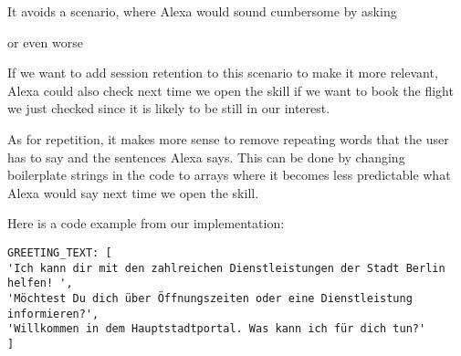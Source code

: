 

\noindent It avoids a scenario, where Alexa would sound cumbersome by asking

\begin{flushright}
\end{flushright}

\noindent or even worse
\begin{flushright}
\end{flushright}

\noindent If we want to add session retention to this scenario to make it more relevant, Alexa could also check next time we open the skill if we want to book the flight we just checked since it is likely to be still in our interest.

As for repetition, it makes more sense to remove repeating words that the user has to say and the sentences Alexa says. This can be done by changing boilerplate strings in the code to arrays where it becomes less predictable what Alexa would say next time we open the skill.

\noindent  Here is a code example from our implementation:

\begin{verbatim}
GREETING_TEXT: [
'Ich kann dir mit den zahlreichen Dienstleistungen der Stadt Berlin helfen! ',
'Möchtest Du dich über Öffnungszeiten oder eine Dienstleistung informieren?',
'Willkommen in dem Hauptstadtportal. Was kann ich für dich tun?'
]
\end{verbatim}

